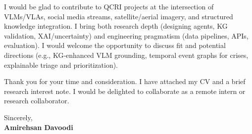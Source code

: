 \documentclass[11pt]{article}
\begin{document}
I would be glad to contribute to QCRI projects at the intersection of VLMs/VLAs, social media streams, satellite/aerial imagery, and structured knowledge integration. I bring both research depth (designing agents, KG validation, XAI/uncertainty) and engineering pragmatism (data pipelines, APIs, evaluation). I would welcome the opportunity to discuss fit and potential directions (e.g., KG-enhanced VLM grounding, temporal event graphs for crises, explainable triage and prioritization).

Thank you for your time and consideration. I have attached my CV and a brief research interest note. I would be delighted to collaborate as a remote intern or research collaborator.

Sincerely,\\[6pt]
\textbf{Amirehsan Davoodi}
\end{document}
